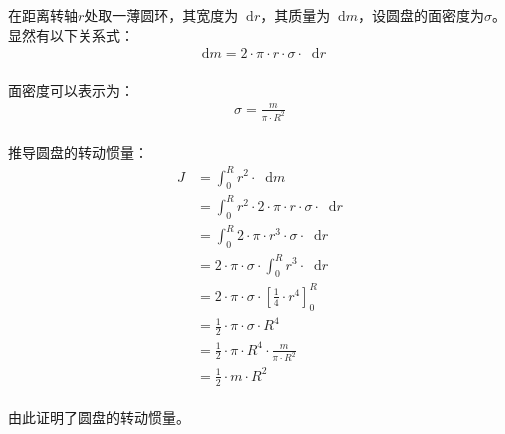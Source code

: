 \documentclass[UTF8]{ctexart}
\newcommand*{\dif}{\mathop{}\!\mathrm{d}}
\begin{document}
    在距离转轴$r$处取一薄圆环，其宽度为$\dif r$，其质量为$\dif m$，设圆盘的面密度为$\sigma$。\\[3mm]
    显然有以下关系式：
    \setcounter{equation}{0}
    \begin{align}
        \dif m=2\cdot\pi\cdot r\cdot\sigma\cdot\dif r
    \end{align}\\
    面密度可以表示为：
    \begin{align}
        \sigma=\frac{m}{\pi\cdot R^2}
    \end{align}\\
    推导圆盘的转动惯量：
    \begin{align}
        J
        &=\int_{0}^{R} r^2\cdot\dif m\\[3mm]
        &=\int_{0}^{R} r^2\cdot 2\cdot\pi\cdot r\cdot\sigma\cdot\dif r\\[3mm]
        &=\int_{0}^{R} 2\cdot\pi\cdot r^3\cdot\sigma\cdot\dif r\\[3mm]
        &=2\cdot\pi\cdot\sigma\cdot\int_{0}^{R}r^3\cdot\dif r\\[3mm]
        &=2\cdot\pi\cdot\sigma\cdot\left[\frac{1}{4}\cdot r^4\right]_{0}^{R}\\[3mm]
        &=\frac{1}{2}\cdot\pi\cdot\sigma\cdot R^4\\[3mm]
        &=\frac{1}{2}\cdot\pi\cdot R^4\cdot\frac{m}{\pi\cdot R^2}\\[3mm]
        &=\frac{1}{2}\cdot m\cdot R^2
    \end{align}\\
    由此证明了圆盘的转动惯量。

\newpage
\end{document}
